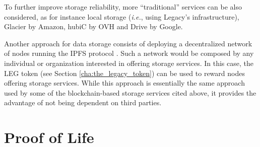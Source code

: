 To further improve storage reliability, more ``traditional'' services can be also considered, as for instance local storage (\textit{i.e.}, using Legacy's infrastructure), Glacier by Amazon, hubiC by OVH and Drive by Google.

Another approach for data storage consists of deploying a decentralized network of nodes running the IPFS protocol \cite{Benet}. Such a network would be composed by any individual or organization interested in offering storage services. In this case, the LEG token (see Section \ref{cha:the_legacy_token}) can be used to reward nodes offering storage services.
While this approach is essentially the same approach used by some of the blockchain-based storage services cited above, it provides the advantage of not being dependent on third parties.


\section{Proof of Life} %
\label{sec:proof_of_life}

